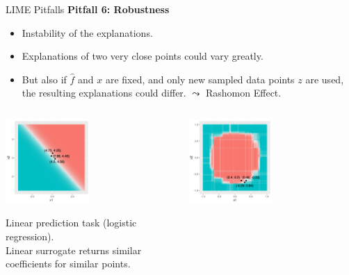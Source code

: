 \documentclass[aspectratio=169]{../latex_main/tntbeamer}  %
\begin{document}
\begin{frame}{LIME Pitfalls }
\vspace{-1em}
\textbf{Pitfall 6: Robustness}
\begin{itemize}
	\item Instability of the explanations. 
	\item Explanations of two very close points could vary greatly. 
	\item But also if $\hat{f}$ and $x$ are fixed, and only new sampled data points $z$ are used, the resulting explanations could differ. $\leadsto$ \alert{Rashomon Effect}. 
\end{itemize}
\vspace{-0.7cm}
\begin{columns}
	\begin{column}{0.48\textwidth}
		\begin{center}
		
		\includegraphics[width=0.5\textwidth]{figure/lime_robustness_1.png}
		
		\tiny{Linear prediction task (logistic regression).\\ Linear surrogate returns similar coefficients for similar points.}
		
		\end{center}
	\end{column}
	\begin{column}{0.48\textwidth}
		\begin{center}
	\includegraphics[width=0.5\textwidth]{figure/lime_robustness_2.png}
	

\end{center}
\end{column}
\end{columns}
\end{frame}
\end{document}
